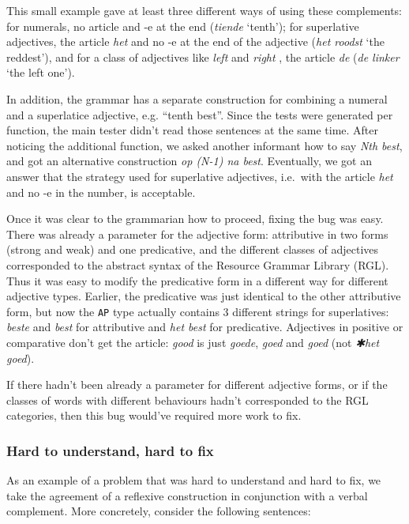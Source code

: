 This small example gave at least three different ways of using these
complements: for numerals, no article and -e at the end (\emph{tiende}
`tenth'); for superlative adjectives, the article \emph{het} and no -e
at the end of the adjective (\emph{het roodst} `the reddest'), and for
a class of adjectives like \emph{left} and \emph{right} , the article \emph{de} (\emph{de linker} `the left
one').

In addition, the grammar has a separate construction for combining a
numeral and a superlatice adjective, e.g. ``tenth best''. Since the
tests were generated per function, the main tester didn't read those
sentences at the same time. After noticing the additional function, we
asked another informant how to say \emph{Nth best}, and got an
alternative construction \emph{op (N-1) na best}. Eventually, we got an
answer that the strategy used for superlative adjectives, i.e.~with the
article \emph{het} and no -e in the number, is acceptable.

Once it was clear to the grammarian how to proceed, fixing the bug was
easy. There was already a parameter for the adjective form: attributive
in two forms (strong and weak) and one predicative, and the different
classes of adjectives corresponded to the abstract syntax of the \gf{}
Resource Grammar Library (RGL).
Thus it was easy to modify the predicative form in a different way for
different adjective types. Earlier, the predicative was just identical
to the other attributive form, but now the \texttt{AP} type actually
contains 3 different strings for superlatives: \emph{beste} and
\emph{best} for attributive and \emph{het best} for predicative.
Adjectives in positive or comparative don't get the article: \emph{good}
is just \emph{goede}, \emph{goed} and \emph{goed} (not \emph{✱het
goed}).

If there hadn't been already a parameter for different adjective forms,
or if the classes of words with different behaviours hadn't corresponded
to the RGL categories, then this bug would've required more work to fix.

\subsubsection{Hard to understand, hard to
fix}\label{hard-to-understand-hard-to-fix}

As an example of a problem that was hard to understand and hard to fix,
we take the agreement of a reflexive construction in conjunction with a
verbal complement. More concretely, consider the following sentences:


